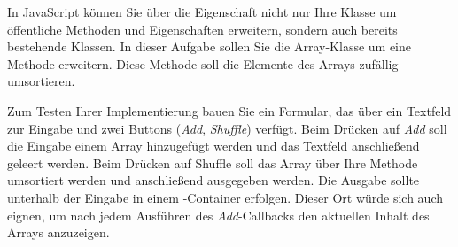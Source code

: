 %
\par In JavaScript können Sie über die  Eigenschaft nicht nur
Ihre Klasse um öffentliche Methoden und Eigenschaften erweitern, sondern auch
bereits bestehende Klassen. In dieser Aufgabe sollen Sie die Array-Klasse um
eine Methode  erweitern. Diese Methode soll die Elemente des
Arrays zufällig umsortieren.
%
\par Zum Testen Ihrer Implementierung bauen Sie ein Formular, das über ein
Textfeld zur Eingabe und zwei Buttons (\emph{Add}, \emph{Shuffle}) verfügt.
Beim Drücken auf \emph{Add} soll die Eingabe einem Array hinzugefügt werden und
das Textfeld anschließend geleert werden. Beim Drücken auf Shuffle soll das
Array über Ihre Methode umsortiert werden und anschließend ausgegeben werden.
Die Ausgabe sollte unterhalb der Eingabe in einem -Container
erfolgen. Dieser Ort würde sich auch eignen, um nach jedem Ausführen des
\emph{Add}-Callbacks den aktuellen Inhalt des Arrays anzuzeigen.